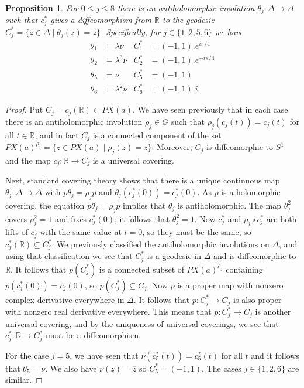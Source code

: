 \documentclass[reqno]{amsart}
\newcommand{\Dl}        {\Delta}
\newcommand{\tht}       {\theta}
\newcommand{\lm}        {\lambda}
\newcommand{\R}         {{\mathbb{R}}}
\newcommand{\ov}[1]     {\overline{#1}}
\newcommand{\st}        {\;|\;}
\newcommand{\sse}       {\subseteq}
\renewcommand{\:}{\colon}
\newtheorem{proposition}[theorem]{Proposition}
\theoremstyle{definition}
\begin{document}
\begin{proposition}
 For $0\leq j\leq 8$ there is an antiholomorphic involution
 $\tht_j\:\Dl\to\Dl$ such that $c_j^*$ gives a diffeomorphism from
 $\R$ to the geodesic $C^*_j=\{z\in\Dl\st\tht_j(z)=z\}$.
 Specifically, for $j\in\{1,2,5,6\}$ we have
 \begin{align*}
  \tht_1 &= \lm\nu   & C^*_1 &= (-1,1).e^{ i\pi/4} \\
  \tht_2 &= \lm^3\nu & C^*_2 &= (-1,1).e^{-i\pi/4} \\
  \tht_5 &= \nu      & C^*_5 &= (-1,1) \\
  \tht_6 &= \lm^2\nu & C^*_6 &= (-1,1).i.
 \end{align*}
\end{proposition}
\begin{proof}
 Put $C_j=c_j(\R)\subset PX(a)$.  We have seen previously that in each
 case there is an antiholomorphic involution $\rho_j\in G$ such that
 $\rho_j(c_j(t))=c_j(t)$ for all $t\in\R$, and in fact $C_j$ is a
 connected component of the set
 $PX(a)^{\rho_j}=\{z\in PX(a)\st\rho_j(z)=z\}$.  Moreover, $C_j$ is
 diffeomorphic to $S^1$ and the map $c_j\:\R\to C_j$ is a universal
 covering.

 Next, standard covering theory shows that there is a
 unique continuous map $\tht_j\:\Dl\to\Dl$ with $p\tht_j=\rho_jp$ and
 $\tht_j(c^*_j(0))=c_j^*(0)$.  As $p$ is a holomorphic covering, the
 equation $p\tht_j=\rho_jp$ implies that $\tht_j$ is antiholomorphic.
 The map $\tht_j^2$ covers $\rho_j^2=1$ and fixes $c_j^*(0)$; it
 follows that $\tht_j^2=1$.  Now $c^*_j$ and $\rho_j\circ c^*_j$ are
 both lifts of $c_j$ with the same value at $t=0$, so they must be the
 same, so $c_j^*(\R)\sse C_j^*$.  We previously classified the
 antiholomorphic involutions on $\Dl$, and using that classification
 we see that $C_j^*$ is a geodesic in $\Dl$ and is diffeomorphic to
 $\R$.  It follows that $p(C_j^*)$ is a connected subset of
 $PX(a)^{\rho_j}$ containing $p(c^*_j(0))=c_j(0)$, so
 $p(C_j^*)\sse C_j$.  Now $p$ is a proper map with nonzero complex
 derivative everywhere in $\Dl$.  It follows that $p\:C_j^*\to C_j$ is
 also proper with nonzero real derivative everywhere.  This means that
 $p\:C_j^*\to C_j$ is another universal covering, and by the
 uniqueness of universal coverings, we see that $c^*_j\:\R\to C_j^*$
 must be a diffeomorphism.

 For the case $j=5$, we have seen that $\nu(c_5^*(t))=c_5^*(t)$ for
 all $t$ and it follows that $\tht_5=\nu$.  We also have
 $\nu(z)=\ov{z}$ so $C_5^*=(-1,1)$.  The cases $j\in\{1,2,6\}$ are
 similar.
\end{proof}
\end{document}
